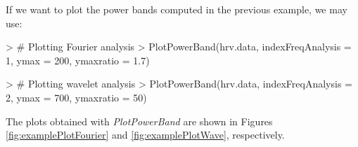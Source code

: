 \documentclass[12pt,lot, lof]{puthesis}
\begin{document}
If we want to plot the power bands computed in the previous example, we may 
use: 
\begin{Schunk}
\begin{Sinput}
> # Plotting Fourier analysis
> PlotPowerBand(hrv.data, indexFreqAnalysis = 1, ymax = 200, ymaxratio = 1.7)
\end{Sinput}
\end{Schunk}
\begin{Schunk}
\begin{Sinput}
> # Plotting wavelet analysis
> PlotPowerBand(hrv.data, indexFreqAnalysis = 2, ymax = 700, ymaxratio = 50)
\end{Sinput}
\end{Schunk}
The plots obtained with \textit{PlotPowerBand} are shown in Figures 
\ref{fig:examplePlotFourier} and \ref{fig:examplePlotWave}, respectively.
\end{document}
